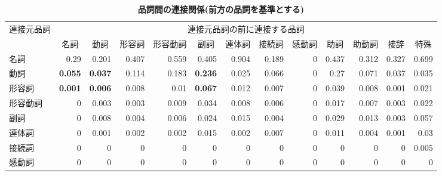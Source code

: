 \begin{table}
\begin{center}
 \caption{\bf 品詞間の連接関係(前方の品詞を基準とする)}
 \label{tab:connect_before_matrix}
 \tiny
\def\arraystretch{}
 \begin{tabular}{l|r|r|r|r|r|r|r|r|r|r|r|r} \hline \hline
 {連接元品詞} & \multicolumn{12}{c}{連接元品詞の前に連接する品詞} 
                                                       \\ \cline{2-13}
             & \multicolumn{1}{c|}{名詞}
             & \multicolumn{1}{c|}{動詞}
             & \multicolumn{1}{c|}{形容詞}
             & \multicolumn{1}{c|}{形容動詞}
             & \multicolumn{1}{c|}{副詞}
             & \multicolumn{1}{c|}{連体詞}
             & \multicolumn{1}{c|}{接続詞}
             & \multicolumn{1}{c|}{感動詞}
             & \multicolumn{1}{c|}{助詞}
             & \multicolumn{1}{c|}{助動詞}
             & \multicolumn{1}{c|}{接辞}
             & \multicolumn{1}{c}{特殊} \\ \hline 
   名詞      & 0.29 & 0.201 & 0.407 & 0.559 & 0.405
             & 0.904 & 0.189 &     0  & 0.437
             & 0.312 & 0.327 & 0.699  \\
   \hline
   動詞      &{\bf 0.055} &{\bf 0.037} & 0.114 & 0.183 &{\bf 0.236} 
             & 0.025 &  0.066 &      0 & 0.27     
             &  0.071 &  0.037 &  0.035  \\
   \hline
   形容詞    & {\bf 0.001} & {\bf 0.006} &  0.008 &  0.01 &{\bf 0.067} 
             &  0.012 &  0.007 &      0 & 0.039
             &  0.008 &  0.001 & 0.021  \\
   \hline
   形容動詞  &     0  &  0.003 &  0.003 &  0.009 &  0.034 
             &  0.008 &  0.006 &     0  & 0.017 
             &  0.007 &  0.003 & 0.022  \\
   \hline
   副詞      &     0  &  0.008 &  0.004 &  0.006 &  0.024 
             & 0.015  &  0.004 &      0 & 0.029
             &  0.013 &  0.003 & 0.057  \\
   \hline
   連体詞    &     0  &  0.001 &  0.002 &  0.002 &  0.015
             & 0.002  &  0.007 &     0  & 0.011
             &  0.004 &  0.001 & 0.03  \\
   \hline
   接続詞    &      0 &      0 &      0 &      0 &     0
             &      0 &      0 &      0 &      0 
             &      0 &      0 &  0.005 \\
   \hline
   感動詞    &      0 &      0 &      0 &      0 &     0
             &      0 &      0 &      0 &      0
             &      0 &      0 &      0 \\

\end{tabular}
\end{center}
\end{table}

